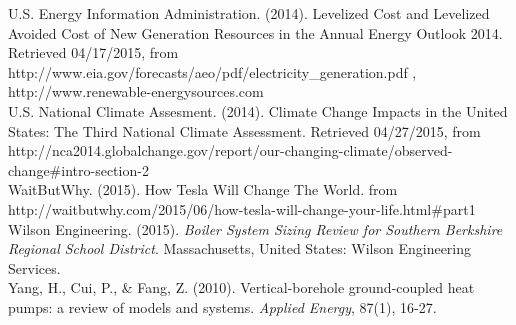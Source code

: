 \hangindent=0.5in
U.S. Energy Information Administration. (2014). Levelized Cost and Levelized Avoided Cost of New Generation Resources in the Annual Energy Outlook 2014. Retrieved 04\slash 17\slash 2015, from http:\slash \slash www.eia.gov\slash forecasts\slash aeo\slash pdf\slash electricity\_generation.pdf , http:\slash \slash www.renewable-energysources.com \\

\hangindent=0.5in
U.S. National Climate Assesment. (2014). Climate Change Impacts in the United States: The Third National Climate Assessment. Retrieved 04\slash 27\slash 2015, from http:\slash \slash nca2014.globalchange.gov\slash report\slash our-changing-climate\slash observed-change\#intro-section-2 \\

\hangindent=0.5in
WaitButWhy. (2015). How Tesla Will Change The World. from http:\slash \slash waitbutwhy.com\slash 2015\slash 06\slash how-tesla-will-change-your-life.html\#part1 \\

\hangindent=0.5in
Wilson Engineering. (2015). \emph{Boiler System Sizing Review for Southern Berkshire Regional School District}. Massachusetts, United States: Wilson Engineering Services. \\

\hangindent=0.5in
Yang, H., Cui, P., \& Fang, Z. (2010). Vertical-borehole ground-coupled heat pumps: a review of models and systems. \emph{Applied Energy}, 87(1), 16-27.
